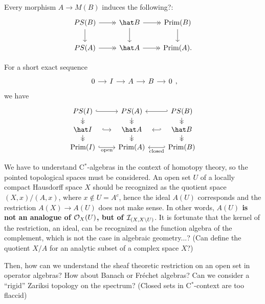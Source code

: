 \documentclass{../../large}
\newcommand{\Prim}{\operatorname{Prim}}
\begin{document}
Every morphism $A\to M(B)$ induces the following?:
\[\begin{tikzcd}
PS(B) \rar[->>]\dar & \hat B \rar[->>]\dar & \Prim(B) \dar \\
PS(A) \rar[->>] & \hat A \rar[->>] & \Prim(A).
\end{tikzcd}\]



For a short exact sequence
\[\begin{tikzcd}[column sep=small]0\rar&I\rar&A\rar&B\rar&0\end{tikzcd},\]
we have
\[\begin{tikzcd}[row sep=small]
PS(I) \dar[->>]\rar[hook] & PS(A) \dar[->>] & PS(B) \dar[->>]\lar[hook'] \\
\hat I \dar[->>]\rar[hook,shorten >= 10, shorten <= 10] & \hat A \dar[->>] & \hat B \dar[->>]\lar[hook',shorten >= 10, shorten <= 10] \\
\Prim(I) \rar[hook,swap]{\text{open}} & \Prim(A) & \Prim(B) \lar[hook']{\text{closed}}
\end{tikzcd}\]

We have to understand C$^*$-algebras in the context of homotopy theory, so the pointed topological spaces must be considered.
An open set $U$ of a locally compact Hausdorff space $X$ should be recognized as the quotient space $(X,x)/(A,x)$, where $x\notin U=A^c$, hence the ideal $A(U)$ corresponds and the restriction $A(X)\to A(U)$ does not make sense.
In other words, \textbf{$A(U)$ is not an analogue of $\mathcal{O}_X(U)$, but of $\mathcal{I}_{(X,X\setminus U)}$}.
It is fortunate that the kernel of the restriction, an ideal, can be recognized as the function algebra of the complement, which is not the case in algebraic geometry...? (Can define the quotient $X/A$ for an analytic subset of a complex space $X$?)

Then, how can we understand the sheaf theoretic restriction on an open set in operator algebras?
How about Banach or Fr\'echet algebras?
Can we consider a ``rigid'' Zariksi topology on the spectrum? (Closed sets in C$^*$-context are too flaccid)




\begin{prb}
\end{prb}
\end{document}
